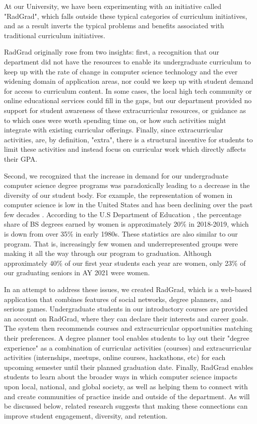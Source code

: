 \documentclass[acmsmall,nonacm]{acmart}
\begin{document}
At our University, we have been experimenting with an initiative called "RadGrad", which falls outside these typical categories of curriculum initiatives, and as a result inverts the typical problems and benefits associated with traditional curriculum initiatives.

RadGrad originally rose from two insights: first, a recognition that our department did not have the resources to enable its undergraduate curriculum to keep up with the rate of change in computer science technology and the ever widening domain of application areas, nor could we keep up with student demand for access to curriculum content.  In some cases, the local high tech community or online educational services could fill in the gaps, but our department provided no support for student awareness of these extracurricular resources, or guidance as to which ones were worth spending time on, or how such activities might integrate with existing curricular offerings.  Finally, since extracurricular activities, are, by definition, "extra", there is a structural incentive for students to limit these activities and instead focus on curricular work which directly affects their GPA.

Second, we recognized that the increase in demand for our undergraduate computer science degree programs was paradoxically leading to a decrease in the diversity of our student body. For example, the representation of women in computer science is low in the United States and has been declining over the past few decades \cite{moudgalya_computer_2019}. According to the U.S Department of Education \cite{us_department_of_education_digest_2019}, the percentage share of BS degrees earned by women is approximately 20\% in 2018-2019, which is down from over 35\% in early 1980s. These statistics are also similar to our program. That is, increasingly few women and underrepresented groups were making it all the way through our program to graduation. Although approximately 40\% of our first year students each year are women, only 23\% of our graduating seniors in AY 2021 were women.

In an attempt to address these issues, we created RadGrad, which is a web-based application that combines features of social networks, degree planners, and serious games.  Undergraduate students in our introductory courses are provided an account on RadGrad, where they can declare their interests and career goals. The system then recommends courses and extracurricular opportunities matching their preferences. A degree planner tool enables students to lay out their "degree experience" as a combination of curricular activities (courses) and extracurricular activities (internships, meetups, online courses, hackathons, etc) for each upcoming semester until their planned graduation date. Finally, RadGrad enables students to learn about the broader ways in which computer science impacts upon local, national, and global society, as well as helping them to connect with and create communities of practice inside and outside of the department. As will be discussed below, related research suggests that making these connections can improve student engagement, diversity, and retention.
\end{document}
